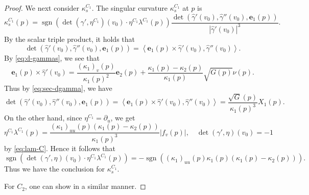 \documentclass[11pt,a4paper,pdflatex,final]{amsart}
\theoremstyle{plain}
\theoremstyle{definition}
\theoremstyle{remark}
\newcommand{\hess}{\operatorname{Hess}}
\newcommand{\sgn}{\operatorname{sgn}}
\newcommand{\0}{\bm{0}}
\newcommand{\be}{\bm{e}}
\newcommand{\inner}[2]{\left\langle{#1},{#2}\right\rangle}
\numberwithin{equation}{section}
\begin{document}
{\begin{proof}
	We next consider $\kappa_s^{C_1}$. 
	The singular curvature $\kappa_s^{C_1}$ at $p$ is 
	\[
	\kappa_s^{C_1}(p)
	=\sgn(\det(\gamma',\eta^{C_1})(v_0)\cdot\eta^{C_1}\lambda^{C_1}(p))
	\frac{\det(\hat{\gamma}'(v_0),\hat{\gamma}''(v_0),\be_1(p))}
	{|\hat{\gamma}'(v_0)|^3}.
	\]	
	By the scalar triple product, 
	it holds that 
	\[
	\det(\hat{\gamma}'(v_0),\hat{\gamma}''(v_0),\be_1(p))
	=\inner{\be_1(p)\times\hat{\gamma}'(v_0)}{\hat{\gamma}''(v_0)}.
	\]
	By \eqref{eq:d-gammas}, we see that 
	\[
	\be_1(p)\times\hat{\gamma}'(v_0)
	=\frac{(\kappa_1)_v(p)}{\kappa_1(p)^2}\be_2(p)
	+\frac{\kappa_1(p)-\kappa_2(p)}{\kappa_1(p)}\sqrt{G(p)}\nu(p).
	\]
	Thus by \eqref{eq:sec-dgamma}, we have 
	\[
	\det(\hat{\gamma}'(v_0),\hat{\gamma}''(v_0),\be_1(p))
	=\inner{\be_1(p)\times \hat{\gamma}'(v_0)}{\hat{\gamma}''(v_0)}
	=\frac{\sqrt{G}(p)}{\kappa_1(p)^3}X_1(p).
	\]
	On the other hand, 
	since $\eta^{C_1}=\partial_u$, we get 
	\[
	\eta^{C_1}\lambda^{C_1}(p)=\frac{(\kappa_1)_{uu}(p)(\kappa_1(p)-\kappa_2(p))}{\kappa_1(p)^3}|f_v(p)|,\quad 
	\det(\gamma',\eta)(v_0)=-1
	\]
	by \eqref{eq:lam-C}. 
	Hence it follows that 
	\[
	\sgn(\det(\gamma',\eta)(v_0)\cdot\eta^{C_1}\lambda^{C_1}(p))
	=-\sgn((\kappa_1)_{uu}(p)\kappa_1(p)(\kappa_1(p)-\kappa_2(p))).
	\]
	Thus we have the conclusion for $\kappa_s^{C_1}$. 
	
	For $C_2$, one can show in a similar manner. 
\end{proof}
}
\end{document}
